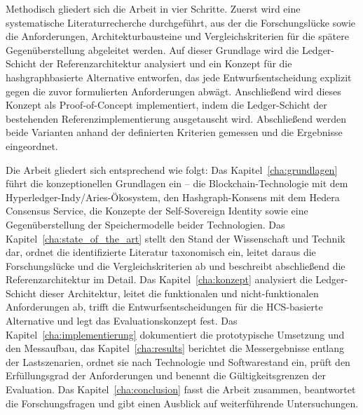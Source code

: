 Methodisch gliedert sich die Arbeit in vier Schritte. Zuerst wird eine systematische Literaturrecherche durchgeführt, aus der die Forschungslücke sowie die Anforderungen, Architekturbausteine und Vergleichskriterien für die spätere Gegenüberstellung abgeleitet werden. Auf dieser Grundlage wird die Ledger-Schicht der Referenzarchitektur analysiert und ein Konzept für die hashgraphbasierte Alternative entworfen, das jede Entwurfsentscheidung explizit gegen die zuvor formulierten Anforderungen abwägt. Anschließend wird dieses Konzept als Proof-of-Concept implementiert, indem die Ledger-Schicht der bestehenden Referenzimplementierung ausgetauscht wird. Abschließend werden beide Varianten anhand der definierten Kriterien gemessen und die Ergebnisse eingeordnet.

Die Arbeit gliedert sich entsprechend wie folgt: Das Kapitel~\ref{cha:grundlagen} führt die konzeptionellen Grundlagen ein -- die Blockchain-Technologie mit dem Hyperledger-Indy/Aries-Ökosystem, den Hashgraph-Konsens mit dem Hedera Consensus Service, die Konzepte der Self-Sovereign Identity sowie eine Gegenüberstellung der Speichermodelle beider Technologien. Das Kapitel~\ref{cha:state_of_the_art} stellt den Stand der Wissenschaft und Technik dar, ordnet die identifizierte Literatur taxonomisch ein, leitet daraus die Forschungslücke und die Vergleichskriterien ab und beschreibt abschließend die Referenzarchitektur im Detail. Das Kapitel~\ref{cha:konzept} analysiert die Ledger-Schicht dieser Architektur, leitet die funktionalen und nicht-funktionalen Anforderungen ab, trifft die Entwurfsentscheidungen für die HCS-basierte Alternative und legt das Evaluationskonzept fest. Das Kapitel~\ref{cha:implementierung} dokumentiert die prototypische Umsetzung und den Messaufbau, das Kapitel~\ref{cha:results} berichtet die Messergebnisse entlang der Lastszenarien, ordnet sie nach Technologie und Softwarestand ein, prüft den Erfüllungsgrad der Anforderungen und benennt die Gültigkeitsgrenzen der Evaluation. Das Kapitel~\ref{cha:conclusion} fasst die Arbeit zusammen, beantwortet die Forschungsfragen und gibt einen Ausblick auf weiterführende Untersuchungen.